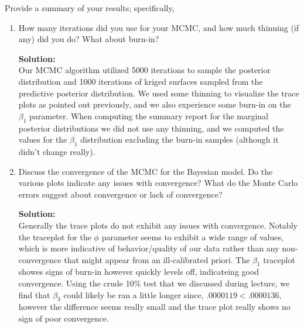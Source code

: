 \documentclass[12pt]{article}
\makeatletter
\theoremstyle{homework}
\newenvironment{exercise}[1]
{\def\@currentlabel{#1}\exercisecore}
{\endexercisecore}
\newcommand{\localhead}[1]{\par\smallskip\noindent\textbf{#1}\nobreak\\}%
\newcommand\solution{\localhead{Solution:}}
\makeatother
\begin{document}
\vspace{1in}




\begin{exercise}{6} Provide a summary of your results; specifically, 
  \begin{enumerate}
    \item How many iterations did you use for your MCMC, and how much thinning (if any) did you do? What about burn-in?\\
    \solution Our MCMC algorithm utilized 5000 iterations to sample the posterior distribution and 1000 iterations of kriged surfaces sampled 
    from the predictive posterior distribution. We used some thinning to visualize the trace plots as pointed out previously, and we also experience some 
    burn-in on the $\beta_1$ parameter. When computing the summary report for the marginal posterior distributions we did not use any thinning, and 
    we computed the values for the $\beta_1$ distribution excluding the burn-in samples (although it didn't change really). 



    \item Discuss the convergence of the MCMC for the Bayesian model. Do the various plots indicate any issues with convergence?
    What do the Monte Carlo errors suggest about convergence or lack of convergence?\\
    \solution Generally the trace plots do not exhibit any issues with convergence. Notably the traceplot for the $\phi$ parameter seems to exhibit a wide range 
    of values, which is more indicative of behavior/quality of our data rather than any non-convergence that might appear from an ill-calibrated priori. The $\beta_1$ traceplot
    showes signs of burn-in however quickly levels off, indicateing good convergence.  Using the crude 10\% 
    test that we discussed during lecture, we find that $\beta_3$ could likely be ran a little longer since, $.0000119 < .0000136$, however the difference seems really small and 
    the trace plot really shows no sign of poor convergence. 
  \end{enumerate}
\end{exercise}
\vspace{1in}
\end{document}
